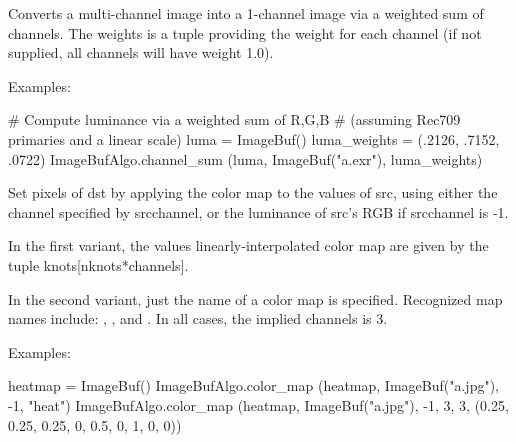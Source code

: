  
Converts a multi-channel image into a 1-channel image via a weighted sum
of channels. The {\cf weights} is a tuple providing the weight for each 
channel (if not supplied, all channels will have weight 1.0).

\smallskip
\noindent Examples:
\begin{code}
    # Compute luminance via a weighted sum of R,G,B
    # (assuming Rec709 primaries and a linear scale)
    luma = ImageBuf()
    luma_weights = (.2126, .7152, .0722)
    ImageBufAlgo.channel_sum (luma, ImageBuf("a.exr"), luma_weights)
\end{code}
\apiend


 
\NEW %
Set pixels of {\cf dst} by applying the color map to the values of {\cf
src}, using either the channel specified by {\cf srcchannel}, or the
luminance of {\cf src}'s RGB if {\cf srcchannel} is -1.

In the first variant, the values linearly-interpolated color map are
given by the tuple {\cf knots[nknots*channels]}.

In the second variant, just the name of a color map is specified. Recognized
map names include: , , and . In all
cases, the implied {\cf channels} is 3.

\smallskip
\noindent Examples:
\begin{code}
    heatmap = ImageBuf()
    ImageBufAlgo.color_map (heatmap, ImageBuf("a.jpg"), -1, "heat")
    ImageBufAlgo.color_map (heatmap, ImageBuf("a.jpg"), -1, 3, 3,
                            (0.25, 0.25, 0.25,  0, 0.5, 0,  1, 0, 0))
\end{code}
\apiend


 


